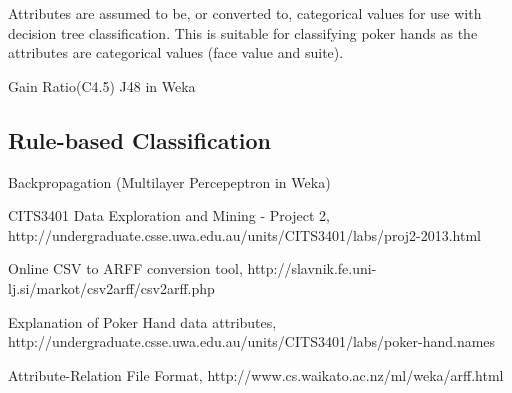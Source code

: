 \documentclass[11pt, a4paper]{article}
\begin{document}
Attributes are assumed to be, or converted to, categorical values for use with decision tree classification. This is suitable for classifying poker hands as the attributes are categorical values (face value and suite).

Gain Ratio(C4.5)
J48 in Weka


\subsection*{Rule-based Classification}

Backpropagation (Multilayer Percepeptron in Weka)

\begin{thebibliography}{9}

	CITS3401 Data Exploration and Mining - Project 2,
	http://undergraduate.csse.uwa.edu.au/units/CITS3401/labs/proj2-2013.html

	Online CSV to ARFF conversion tool,
	http://slavnik.fe.uni-lj.si/markot/csv2arff/csv2arff.php

	Explanation of Poker Hand data attributes,
	http://undergraduate.csse.uwa.edu.au/units/CITS3401/labs/poker-hand.names

	Attribute-Relation File Format,
	http://www.cs.waikato.ac.nz/ml/weka/arff.html

\end{thebibliography}


\end{document}
